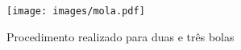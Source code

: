 \begin{figure}[h]
    \centering
    \texttt{[image: images/mola.pdf]}
    \caption{Procedimento realizado para duas e três bolas}
    \label{fig:figure2}
\end{figure}